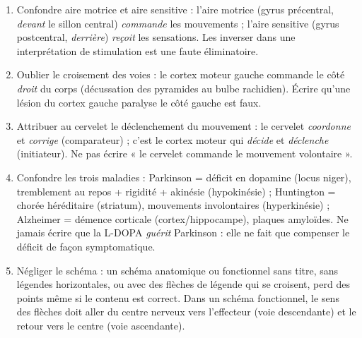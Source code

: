 \documentclass[11pt]{article}
\newcommand{\cle}[1]{{\popxbold\color{popdark}#1}}
\begin{document}
\begin{attention}
\begin{enumerate}
\item \cle{Confondre aire motrice et aire sensitive} : l'aire motrice (gyrus précentral, \emph{devant} le sillon central) \emph{commande} les mouvements ; l'aire sensitive (gyrus postcentral, \emph{derrière}) \emph{reçoit} les sensations. Les inverser dans une interprétation de stimulation est une faute éliminatoire.
\item \cle{Oublier le croisement des voies} : le cortex moteur gauche commande le côté \emph{droit} du corps (décussation des pyramides au bulbe rachidien). Écrire qu'une lésion du cortex gauche paralyse le côté gauche est faux.
\item \cle{Attribuer au cervelet le déclenchement du mouvement} : le cervelet \emph{coordonne} et \emph{corrige} (comparateur) ; c'est le cortex moteur qui \emph{décide} et \emph{déclenche} (initiateur). Ne pas écrire « le cervelet commande le mouvement volontaire ».
\item \cle{Confondre les trois maladies} : Parkinson = déficit en dopamine (locus niger), tremblement au repos + rigidité + akinésie (hypokinésie) ; Huntington = chorée héréditaire (striatum), mouvements involontaires (hyperkinésie) ; Alzheimer = démence corticale (cortex/hippocampe), plaques amyloïdes. Ne jamais écrire que la L-DOPA \emph{guérit} Parkinson : elle ne fait que compenser le déficit de façon symptomatique.
\item \cle{Négliger le schéma} : un schéma anatomique ou fonctionnel sans titre, sans légendes horizontales, ou avec des flèches de légende qui se croisent, perd des points même si le contenu est correct. Dans un schéma fonctionnel, le sens des flèches doit aller du centre nerveux vers l'effecteur (voie descendante) et le retour vers le centre (voie ascendante).
\end{enumerate}
\end{attention}
\end{document}
